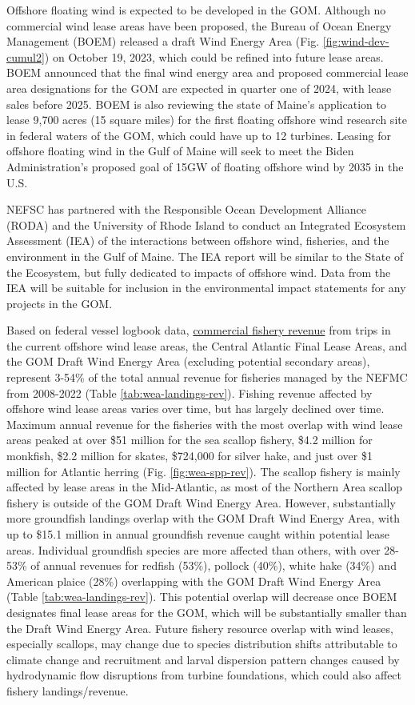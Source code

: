 \documentclass[
  10pt,
]{article}
\begin{document}
Offshore floating wind is expected to be developed in the GOM. Although no commercial wind lease areas have been proposed, the Bureau of Ocean Energy Management (BOEM) released a draft Wind Energy Area (Fig. \ref{fig:wind-dev-cumul2}) on October 19, 2023, which could be refined into future lease areas. BOEM announced that the final wind energy area and proposed commercial lease area designations for the GOM are expected in quarter one of 2024, with lease sales before 2025. BOEM is also reviewing the state of Maine's application to lease 9,700 acres (15 square miles) for the first floating offshore wind research site in federal waters of the GOM, which could have up to 12 turbines. Leasing for offshore floating wind in the Gulf of Maine will seek to meet the Biden Administration's proposed goal of 15GW of floating offshore wind by 2035 in the U.S.

NEFSC has partnered with the Responsible Ocean Development Alliance (RODA) and the University of Rhode Island to conduct an Integrated Ecosystem Assessment (IEA) of the interactions between offshore wind, fisheries, and the environment in the Gulf of Maine. The IEA report will be similar to the State of the Ecosystem, but fully dedicated to impacts of offshore wind. Data from the IEA will be suitable for inclusion in the environmental impact statements for any projects in the GOM.

Based on federal vessel logbook data, \href{https://noaa-edab.github.io/catalog/wind_revenue.html}{commercial fishery revenue} from trips in the current offshore wind lease areas, the Central Atlantic Final Lease Areas, and the GOM Draft Wind Energy Area (excluding potential secondary areas), represent 3-54\% of the total annual revenue for fisheries managed by the NEFMC from 2008-2022 (Table \ref{tab:wea-landings-rev}). Fishing revenue affected by offshore wind lease areas varies over time, but has largely declined over time. Maximum annual revenue for the fisheries with the most overlap with wind lease areas peaked at over \$51 million for the sea scallop fishery, \$4.2 million for monkfish, \$2.2 million for skates, \$724,000 for silver hake, and just over \$1 million for Atlantic herring (Fig. \ref{fig:wea-spp-rev}). The scallop fishery is mainly affected by lease areas in the Mid-Atlantic, as most of the Northern Area scallop fishery is outside of the GOM Draft Wind Energy Area. However, substantially more groundfish landings overlap with the GOM Draft Wind Energy Area, with up to \$15.1 million in annual groundfish revenue caught within potential lease areas. Individual groundfish species are more affected than others, with over 28-53\% of annual revenues for redfish (53\%), pollock (40\%), white hake (34\%) and American plaice (28\%) overlapping with the GOM Draft Wind Energy Area (Table \ref{tab:wea-landings-rev}). This potential overlap will decrease once BOEM designates final lease areas for the GOM, which will be substantially smaller than the Draft Wind Energy Area. Future fishery resource overlap with wind leases, especially scallops, may change due to species distribution shifts attributable to climate change and recruitment and larval dispersion pattern changes caused by hydrodynamic flow disruptions from turbine foundations, which could also affect fishery landings/revenue.
\end{document}
